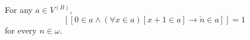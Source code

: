For any $a \in V^{(B)}$,
$$[\![0 \in a \land (\forall x \in a)[x + 1 \in a] \rightarrow \check{n} \in a]\!] = 1$$
for every $n \in \omega$.
